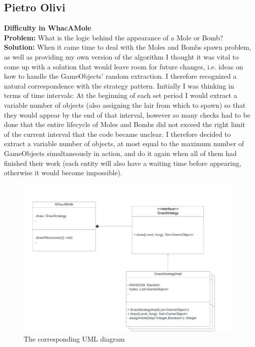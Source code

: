 \documentclass[a4paper,12pt]{report}
\begin{document}
\subsection*{Pietro Olivi}
\textbf{Difficulty in WhacAMole}\\
\textbf{Problem:} What is the logic behind the appearance of a Mole or Bomb?\\
\textbf{Solution:} When it came time to deal with the Moles and Bombs spawn problem, as well as providing my own version of the algorithm
I thought it was vital to come up with a solution that would leave room for future changes, i.e. ideas on how to handle the GameObjects’
random extraction. I therefore recognized a natural correspondence with the strategy pattern. Initially I was thinking in terms of time
intervals: At the beginning of each set period I would extract a variable number of objects (also assigning the lair from which to spawn)
so that they would appear by the end of that interval, however so many checks had to be done that the entire lifecycle of Moles and Bombs
did not exceed the right limit of the current interval that the code became unclear. I therefore decided to extract a variable number of
objects, at most equal to the maximum number of GameObjects simultaneously in action, and do it again when all of them had finished their
work (each entity will also have a waiting time before appearing, otherwise it would become impossible).
\begin{figure}[ht]
	\centering
	\includegraphics[width=\textwidth]{res/DrawStrategy.pdf}
	\caption{The corresponding UML diagram}
\end{figure}
\pagebreak\\
\end{document}
